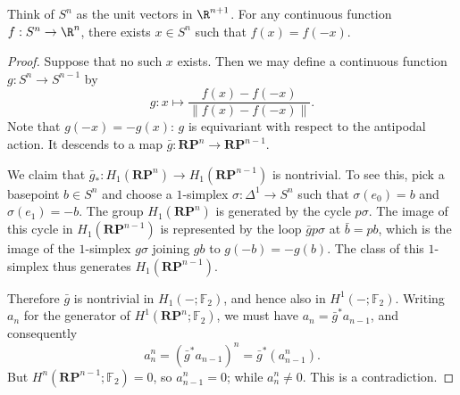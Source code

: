 
\begin{theorem}
Think of $S^n$ as the unit vectors in $\R^{n+1}$. For any continuous function $f:S^n\to\R^n$, there exists $x\in S^n$ such that $f(x)=f(-x)$.
\end{theorem}
\begin{proof}
Suppose that no such $x$ exists. Then we may define a continuous function $g:S^n\to S^{n-1}$ by
\[
g:x\longmapsto\frac{f(x)-f(-x)}{\|f(x)-f(-x)\|}.
\]
Note that $g(-x)=-g(x)$: $g$ is equivariant with respect to the antipodal action. It descends to a map $\bar g:\mathbf{RP}^n\to\mathbf{RP}^{n-1}$.

We claim that $\bar g_*:H_1(\mathbf{RP}^n)\to H_1(\mathbf{RP}^{n-1})$ is nontrivial. To see this, pick a basepoint $b\in S^n$ and choose a $1$-simplex $\sigma:\Delta^1\to S^n$ such that $\sigma(e_0)=b$ and $\sigma(e_1)=-b$. The group $H_1(\mathbf{RP}^n)$ is generated by the cycle $p\sigma$. The image of this cycle in $H_1(\mathbf{RP}^{n-1})$ is represented by the loop $\bar g p\sigma$ at $\bar b=pb$, which is the image of the $1$-simplex $g\sigma$ joining $gb$ to $g(-b)=-g(b)$. The class of this $1$-simplex thus generates $H_1(\mathbf{RP}^{n-1})$.

Therefore $\bar g$ is nontrivial in $H_1(-;\mathbb F_2)$, and hence also in $H^1(-;\mathbb F_2)$. Writing $a_n$ for the generator of $H^1(\mathbf{RP}^n;\mathbb F_2)$, we must have $a_n=\bar g^*a_{n-1}$, and consequently
\[
a_n^n=(\bar g^*a_{n-1})^n=\bar g^*(a_{n-1}^n).
\]
But $H^n(\mathbf{RP}^{n-1};\mathbb F_2)=0$, so $a_{n-1}^n=0$; while $a_n^n\neq0$. This is a contradiction.
\end{proof}

